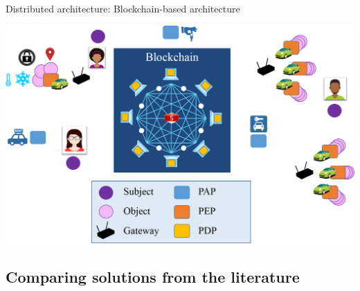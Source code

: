 \begin{frame}{Distributed architecture: Blockchain-based architecture}
    \begin{center}
        \includegraphics[scale=0.35]{Figures/bc_archi_alt.png}
    \end{center}    
\end{frame}

\subsection{Comparing solutions from the literature}

